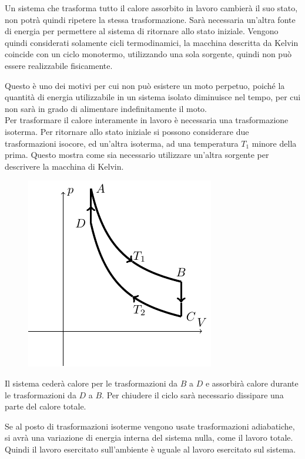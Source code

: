 \documentclass{article}
\numberwithin{equation}{subsection}
\begin{document}
Un sistema che trasforma tutto il calore assorbito in lavoro 
cambierà il suo stato, non potrà quindi ripetere 
la stessa trasformazione. Sarà necessaria un'altra fonte di 
energia per permettere al sistema di ritornare allo stato iniziale. 
Vengono quindi considerati solamente cicli termodinamici, la macchina descritta da Kelvin coincide con un ciclo monotermo, utilizzando una sola sorgente, quindi non può 
essere realizzabile fisicamente. 


Questo è uno dei motivi per cui non può esistere un moto 
perpetuo, poiché la quantità di energia utilizzabile in un sistema isolato diminuisce nel tempo, per cui non sarà in grado di alimentare 
indefinitamente il moto. 
\\ 
Per trasformare il calore interamente in lavoro è necessaria una trasformazione 
isoterma. Per ritornare allo stato iniziale si possono considerare 
due trasformazioni isocore, ed un'altra isoterma, ad una temperatura $T_1$ 
minore della prima. Questo mostra come sia necessario utilizzare un'altra sorgente per descrivere la macchina di Kelvin. 

\begin{figure}[H]%
    \centering
    \includegraphics{kelvin-1.pdf}%
\end{figure}

Il sistema cederà calore per le trasformazioni da $B$ a $D$ e 
assorbirà calore durante le trasformazioni da $D$ a $B$. 
Per chiudere il ciclo sarà necessario dissipare una parte del 
calore totale. 


Se al posto di trasformazioni isoterme vengono 
usate trasformazioni adiabatiche, si avrà una variazione 
di energia interna del sistema nulla, come il lavoro totale. 
Quindi il lavoro esercitato sull'ambiente è uguale al lavoro 
esercitato sul sistema. 
\end{document}
